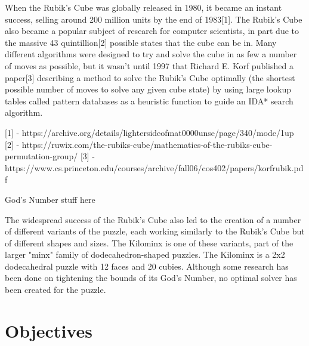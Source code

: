 
When the Rubik's Cube was globally released in 1980, it became an instant success, selling around 200 million units by the end of 1983[1]. The Rubik's Cube also became a popular subject of research for computer scientists, in part due to the massive 43 quintillion[2] possible states that the cube can be in. Many different algorithms were designed to try and solve the cube in as few a number of moves as possible, but it wasn't until 1997 that Richard E. Korf published a paper[3] describing a method to solve the Rubik's Cube optimally (the shortest possible number of moves to solve any given cube state) by using large lookup tables called pattern databases as a heuristic function to guide an IDA* search algorithm. 

[1] - https://archive.org/details/lightersideofmat0000unse/page/340/mode/1up
[2] - https://ruwix.com/the-rubiks-cube/mathematics-of-the-rubiks-cube-permutation-group/
[3] - https://www.cs.princeton.edu/courses/archive/fall06/cos402/papers/korfrubik.pdf

God's Number stuff here


The widespread success of the Rubik's Cube also led to the creation of a number of different variants of the puzzle, each working similarly to the Rubik's Cube but of different shapes and sizes. The Kilominx is one of these variants, part of the larger "minx" family of dodecahedron-shaped puzzles. The Kilominx is a 2x2 dodecahedral puzzle with 12 faces and 20 cubies. Although some research has been done on tightening the bounds of its God's Number, no optimal solver has been created for the puzzle.

\section{Objectives}